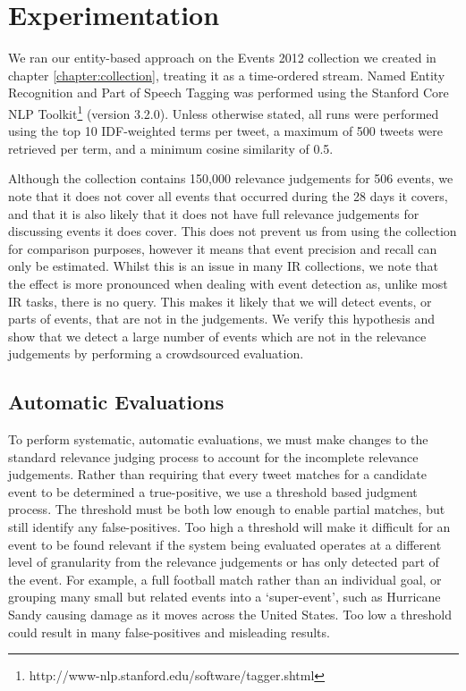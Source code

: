 
\section{Experimentation}
\label{detection:sec:experimentation}
We ran our entity-based approach on the Events 2012 collection we created in chapter \ref{chapter:collection}, treating it as a time-ordered stream.
Named Entity Recognition and Part of Speech Tagging was performed using the Stanford Core NLP Toolkit\footnote{http://www-nlp.stanford.edu/software/tagger.shtml} (version 3.2.0).
Unless otherwise stated, all runs were performed using the top 10 IDF-weighted terms per tweet, a maximum of 500 tweets were retrieved per term, and a minimum cosine similarity of 0.5.

Although the collection contains 150,000 relevance judgements for 506 events, we note that it does not cover all events that occurred during the 28 days it covers, and that it is also likely that it does not have full relevance judgements for discussing events it does cover.
This does not prevent us from using the collection for comparison purposes, however it means that event precision and recall can only be estimated.
Whilst this is an issue in many IR collections, we note that the effect is more pronounced when dealing with event detection as, unlike most IR tasks, there is no query.
This makes it likely that we will detect events, or parts of events, that are not in the judgements.
We verify this hypothesis and show that we detect a large number of events which are not in the relevance judgements by performing a crowdsourced evaluation.

\subsection{Automatic Evaluations}
To perform systematic, automatic evaluations, we must make changes to the standard relevance judging process to account for the incomplete relevance judgements.
Rather than requiring that every tweet matches for a candidate event to be determined a true-positive, we use a threshold based judgment process.
The threshold must be both low enough to enable partial matches, but still identify any false-positives.
Too high a threshold will make it difficult for an event to be found relevant if the system being evaluated operates at a different level of granularity from the relevance judgements or has only detected part of the event.
For example, a full football match rather than an individual goal, or grouping many small but related events into a `super-event', such as Hurricane Sandy causing damage as it moves across the United States.
Too low a threshold could result in many false-positives and misleading results.

